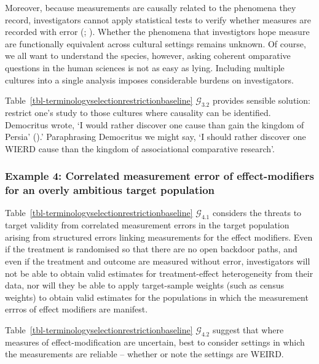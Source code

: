 \documentclass[
  single column]{article}
\begin{document}
Moreover, because measurements are causally related to the phenomena
they record, investigators cannot apply statistical tests to verify
whether measures are recorded with error
(;
). Whether
the phenomena that investigtors hope measure are functionally equivalent
across cultural settings remains unknown. Of course, we all want to
understand the species, however, asking coherent omparative questions in
the human sciences is not as easy as lying. Including multiple cultures
into a single analysis imposes considerable burdens on investigators.

Table~\ref{tbl-terminologyselectionrestrictionbaseline}
\(\mathcal{G}_{3.2}\) provides sensible solution: restrict one's study
to those cultures where causality can be identified. Democritus wrote,
`I would rather discover one cause than gain the kingdom of Persia'
().' Paraphrasing
Democritus we might say, `I should rather discover one WIERD cause than
the kingdom of associational comparative research'.

\subsubsection{Example 4: Correlated measurement error of
effect-modifiers for an overly ambitious target
population}\label{example-4-correlated-measurement-error-of-effect-modifiers-for-an-overly-ambitious-target-population}

Table~\ref{tbl-terminologyselectionrestrictionbaseline}
\(\mathcal{G}_{4.1}\) considers the threats to target validity from
correlated measurement errors in the target population arising from
structured errors linking measurements for the effect modifiers. Even if
the treatment is randomised so that there are no open backdoor paths,
and even if the treatment and outcome are measured without error,
investigators will not be able to obtain valid estimates for
treatment-effect heterogeneity from their data, nor will they be able to
apply target-sample weights (such as census weights) to obtain valid
estimates for the populations in which the measurement errros of effect
modifiers are manifest.

Table~\ref{tbl-terminologyselectionrestrictionbaseline}
\(\mathcal{G}_{4.2}\) suggest that where measures of effect-modification
are uncertain, best to consider settings in which the measurements are
reliable -- whether or note the settings are WEIRD.
\end{document}
